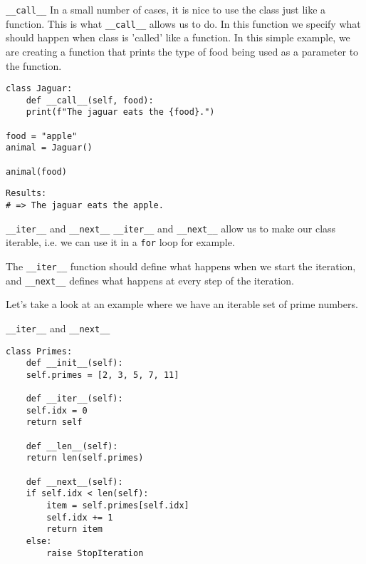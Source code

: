 \documentclass[10pt]{beamer}
\begin{document}
\begin{frame}[label={sec:orga189da9},fragile]{\texttt{\_\_call\_\_}}
 In a small number of cases, it is nice to use the class just like a function. This is
what \texttt{\_\_call\_\_} allows us to do. In this function we specify what should happen when
class is 'called' like a function. In this simple example, we are creating a function
that prints the type of food being used as a parameter to the function.

\begin{verbatim}
class Jaguar:
    def __call__(self, food):
	print(f"The jaguar eats the {food}.")

food = "apple"
animal = Jaguar()

animal(food)
\end{verbatim}

\begin{verbatim}
Results: 
# => The jaguar eats the apple.
\end{verbatim}
\end{frame}

\begin{frame}[label={sec:orgcc497dd},fragile]{\texttt{\_\_iter\_\_} and \texttt{\_\_next\_\_}}
 \texttt{\_\_iter\_\_} and \texttt{\_\_next\_\_} allow us to make our class iterable, i.e. we can use it in a
\texttt{for} loop for example.

The \texttt{\_\_iter\_\_} function should define what happens when we start the iteration, and
\texttt{\_\_next\_\_} defines what happens at every step of the iteration.

Let's take a look at an example where we have an iterable set of prime numbers.
\end{frame}

\begin{frame}[label={sec:org2740e93},fragile]{\texttt{\_\_iter\_\_} and \texttt{\_\_next\_\_}}
 \begin{verbatim}
class Primes:
    def __init__(self):
	self.primes = [2, 3, 5, 7, 11]

    def __iter__(self):
	self.idx = 0
	return self

    def __len__(self):
	return len(self.primes)

    def __next__(self):
	if self.idx < len(self):
	    item = self.primes[self.idx]
	    self.idx += 1
	    return item
	else:
	    raise StopIteration
\end{verbatim}
\end{frame}
\end{document}
